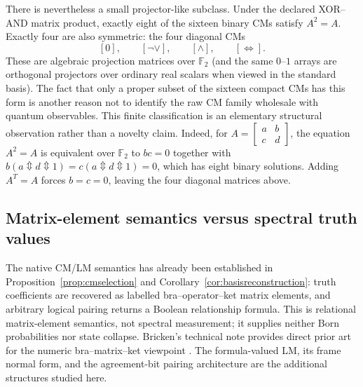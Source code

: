 \documentclass[11pt]{article}
\theoremstyle{definition}
\theoremstyle{remark}
\newcommand{\F}{\mathbb F}
\newcommand{\xor}{\mathbin{\Updownarrow}}
\begin{document}
There is nevertheless a small projector-like subclass.  Under the declared XOR--AND matrix product, exactly eight of the sixteen binary CMs satisfy $A^2=A$.  Exactly four are also symmetric: the four diagonal CMs
\[
 [0],\qquad [\neg\lor],\qquad [\land],\qquad [\Leftrightarrow].
\]
These are algebraic projection matrices over $\F_2$ (and the same $0$--$1$ arrays are orthogonal projectors over ordinary real scalars when viewed in the standard basis).  The fact that only a proper subset of the sixteen compact CMs has this form is another reason not to identify the raw CM family wholesale with quantum observables.  This finite classification is an elementary structural observation rather than a novelty claim.
Indeed, for $A=\left[\begin{smallmatrix}a&b\\c&d\end{smallmatrix}\right]$, the equation $A^2=A$ is equivalent over $\F_2$ to $bc=0$ together with $b(a\xor d\xor1)=c(a\xor d\xor1)=0$, which has eight binary solutions.  Adding $A^T=A$ forces $b=c=0$, leaving the four diagonal matrices above.

\subsection{Matrix-element semantics versus spectral truth values}
The native CM/LM semantics has already been established in Proposition~\ref{prop:cmselection} and Corollary~\ref{cor:basisreconstruction}: truth coefficients are recovered as labelled bra--operator--ket matrix elements, and arbitrary logical pairing returns a Boolean relationship formula.  This is relational matrix-element semantics, not spectral measurement; it supplies neither Born probabilities nor state collapse.  Bricken's technical note provides direct prior art for the numeric bra--matrix--ket viewpoint \cite{Bricken1997}.  The formula-valued LM, its frame normal form, and the agreement-bit pairing architecture are the additional structures studied here.
\end{document}
